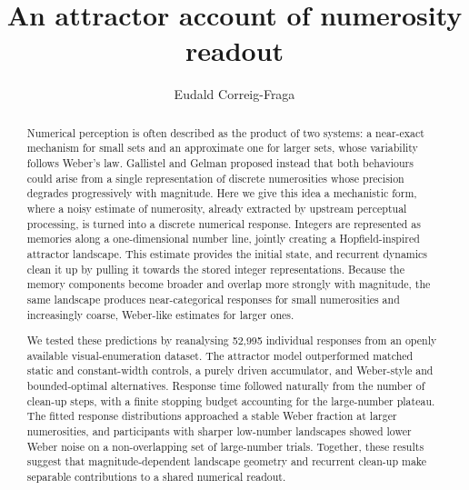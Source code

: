 \documentclass[Afour,sageh,times]{sagej}
\newif\ifmarkrevisions
\newcommand{\revised}[1]{\ifmarkrevisions{\color{red}#1}\else#1\fi}
\begin{document}

\title{\revised{An attractor account of numerosity readout}}

\author{Eudald Correig-Fraga}




\begin{abstract}
  
  Numerical perception is often described as the product of two systems: a near-exact mechanism for small sets and an approximate one for larger sets, whose variability follows Weber's law. Gallistel and Gelman proposed instead that both behaviours could arise from a single representation of discrete numerosities \revised{whose precision degrades progressively with magnitude}. \revised{Here we give this idea a mechanistic form, where a noisy estimate of numerosity, already extracted by upstream perceptual processing, is turned into a discrete numerical response.} Integers are represented as memories along a one-dimensional number line, \revised{jointly creating} a Hopfield-inspired attractor landscape. \revised{This estimate} provides the initial state, and recurrent dynamics clean it up by pulling it towards the stored integer representations. Because the memory components become broader and overlap more strongly with magnitude, the same landscape produces near-categorical responses for small numerosities and increasingly coarse, Weber-like estimates for larger ones.

  \medskip

  We tested these predictions by reanalysing 52,995 individual responses from an openly available visual-enumeration dataset. The attractor model outperformed matched static and constant-width controls, a purely driven accumulator, and Weber-style and bounded-optimal alternatives. Response time followed naturally from the number of clean-up steps, with a finite stopping budget accounting for the large-number plateau. The fitted response distributions approached a stable Weber fraction at larger numerosities, and participants with sharper low-number landscapes showed lower Weber noise on a non-overlapping set of large-number trials. Together, these results suggest that magnitude-dependent landscape geometry and recurrent clean-up make separable contributions to a shared numerical readout.
  \end{abstract}
\end{document}
